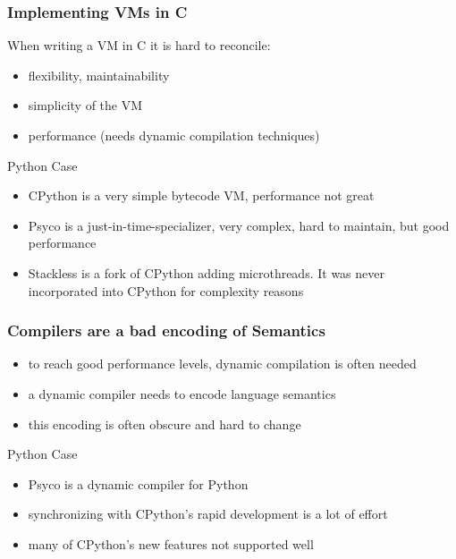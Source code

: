 \documentclass[utf8x]{beamer}
\begin{document}
\begin{frame}
  \frametitle{Implementing VMs in C}
  When writing a VM in C it is hard to reconcile:
  \begin{itemize}
  \item
    flexibility, maintainability
  \item
    simplicity of the VM
  \item
    performance (needs dynamic compilation techniques)
  \end{itemize}
  \pause
  \begin{block}{
    Python Case}
    \begin{itemize}
    \item
      \alert{CPython} is a very simple bytecode VM, performance not great
    \item
      \alert{Psyco} is a just-in-time-specializer, very complex, hard to
      maintain, but good performance
    \item
      \alert{Stackless} is a fork of CPython adding microthreads. It was never
      incorporated into CPython for complexity reasons
    \end{itemize}
  \end{block}
\end{frame}

\begin{frame}
  \frametitle{Compilers are a bad encoding of Semantics}
  \begin{itemize}
  \item to reach good performance levels, dynamic compilation is often needed
  \item a dynamic compiler needs to encode language semantics
  \item this encoding is often obscure and hard to change
  \end{itemize}
  \pause
  \begin{block}{
    Python Case}
    \begin{itemize}
    \item
      Psyco is a dynamic compiler for Python
    \item
      synchronizing with CPython's rapid development is a lot of effort
    \item
      many of CPython's new features not supported well
    \end{itemize}
  \end{block}
\end{frame}
\end{document}
